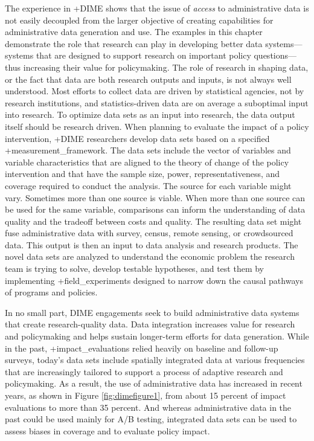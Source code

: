\documentclass[
]{book}
\begin{document}
The experience in +DIME\textbar{} shows that the issue of \emph{access} to administrative data is not easily decoupled from the larger objective of creating capabilities for administrative data generation and use. The examples in this chapter demonstrate the role that research can play in developing better data systems---systems that are designed to support research on important policy questions---thus increasing their value for policymaking. The role of research in shaping data, or the fact that data are both research outputs and inputs, is not always well understood. Most efforts to collect data are driven by statistical agencies, not by research institutions, and statistics-driven data are on average a suboptimal input into research. To optimize data sets as an input into research, the data output itself should be research driven. When planning to evaluate the impact of a policy intervention, +DIME\textbar{} researchers develop data sets based on a specified +measurement\_framework\textbar. The data sets include the vector of variables and variable characteristics that are aligned to the theory of change of the policy intervention and that have the sample size, power, representativeness, and coverage required to conduct the analysis. The source for each variable might vary. Sometimes more than one source is viable. When more than one source can be used for the same variable, comparisons can inform the understanding of data quality and the tradeoff between costs and quality. The resulting data set might fuse administrative data with survey, census, remote sensing, or crowdsourced data. This output is then an input to data analysis and research products. The novel data sets are analyzed to understand the economic problem the research team is trying to solve, develop testable hypotheses, and test them by implementing +field\_experiments\textbar{} designed to narrow down the causal pathways of programs and policies.

In no small part, DIME engagements seek to build administrative data systems that create research-quality data. Data integration increases value for research and policymaking and helps sustain longer-term efforts for data generation. While in the past, +impact\_evaluations\textbar{} relied heavily on baseline and follow-up surveys, today's data sets include spatially integrated data at various frequencies that are increasingly tailored to support a process of adaptive research and policymaking. As a result, the use of administrative data has increased in recent years, as shown in Figure \ref{fig:dimefigure1}, from about 15 percent of impact evaluations to more than 35 percent. And whereas administrative data in the past could be used mainly for A/B testing, integrated data sets can be used to assess biases in coverage and to evaluate policy impact.
\end{document}

